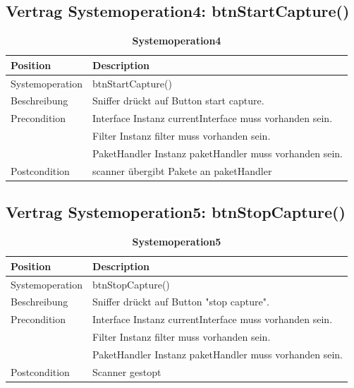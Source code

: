\documentclass[a4,12pt]{scrartcl}
\begin{document}
\subsection{Vertrag Systemoperation4: btnStartCapture()}
\begin{table}[H]
\centering
    \begin{tabular}{@{} l l@{}}    
    {Position} & {Description}\\ \midrule
   	Systemoperation & btnStartCapture()\\ \addlinespace
   	Beschreibung & Sniffer drückt auf Button start capture.\\ \addlinespace
   	Precondition & Interface Instanz currentInterface muss vorhanden sein. \\ \addlinespace
   	& Filter Instanz filter muss vorhanden sein. \\ \addlinespace
   	& PaketHandler Instanz paketHandler muss vorhanden sein. \\ \addlinespace
	Postcondition & scanner übergibt Pakete an paketHandler\\ \bottomrule
    \end{tabular}
\caption{\textbf{Systemoperation4}}
\end{table}
\subsection{Vertrag Systemoperation5: btnStopCapture()}
\begin{table}[H]
\centering
    \begin{tabular}{@{} l l@{}}    
    {Position} & {Description}\\ \midrule
   	Systemoperation & btnStopCapture()\\ \addlinespace
   	Beschreibung & Sniffer drückt auf Button "stop capture".\\ \addlinespace
   	Precondition & Interface Instanz currentInterface muss vorhanden sein. \\ \addlinespace
   	& Filter Instanz filter muss vorhanden sein. \\ \addlinespace
   	& PaketHandler Instanz paketHandler muss vorhanden sein. \\ \addlinespace
	Postcondition & Scanner gestopt \\ \bottomrule
    \end{tabular}
\caption{\textbf{Systemoperation5}}
\end{table}
\end{document}
